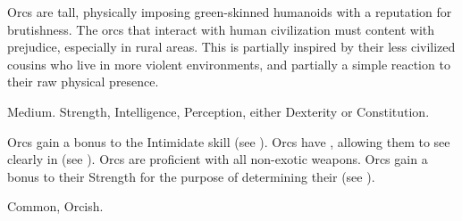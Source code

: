 
  Orcs are tall, physically imposing green-skinned humanoids with a reputation for brutishness.
  The orcs that interact with human civilization must content with prejudice, especially in rural areas.
  This is partially inspired by their less civilized cousins who live in more violent environments, and partially a simple reaction to their raw physical presence.

   Medium.
    Strength,  Intelligence,  Perception, either  Dexterity or  Constitution.
  \begin{raggeditemize}
     Orcs gain a  bonus to the Intimidate skill (see ).
     Orcs have , allowing them to see clearly in  (see ).
     Orcs are proficient with all non-exotic weapons.
     Orcs gain a  bonus to their Strength for the purpose of determining their  (see ).
  \end{raggeditemize}
   Common, Orcish.
